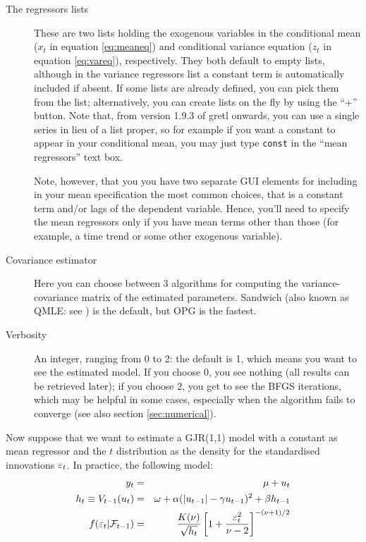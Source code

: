 \documentclass[a4paper,11pt]{article}
\newcommand{\app}[1]{\textsf{#1}}
\newcounter{script}[section]
\newcommand{\stdu}{\ensuremath \varepsilon}
\newcommand{\uhat}{\ensuremath u}
\newcommand{\InfSet}[1]{\ensuremath \mathcal{F}_{#1}}
\begin{document}
\begin{description}
\item[The regressors lists] These are two lists holding the exogenous
  variables in the conditional mean ($x_t$ in equation
  \ref{eq:meaneq}) and conditional variance equation ($z_t$ in
  equation \ref{eq:vareq}), respectively. They both default to empty
  lists, although in the variance regressors list a constant term is
  automatically included if absent. If some lists are already defined,
  you can pick them from the list; alternatively, you can create lists
  on the fly by using the ``+'' button.  Note that, from version 1.9.3
  of \app{gretl} onwards, you can use a single series in lieu of a
  list proper, so for example if you want a constant to appear in your
  conditional mean, you may just type \texttt{const} in the ``mean
  regressors'' text box.

  Note, however, that you you have two separate GUI elements for
  including in your mean specification the most common choices, that
  is a constant term and/or lags of the dependent variable. Hence,
  you'll need to specify the mean regressors only if you have mean
  terms other than those (for example, a time trend or some other
  exogenous variable).

\item[Covariance estimator] Here you can choose between 3 algorithms
  for computing the variance-covariance matrix of the estimated
  parameters. Sandwich (also known as QMLE: see \cite{bolwoo92}) is
  the default, but OPG is the fastest.
\item[Verbosity] An integer, ranging from 0 to 2: the default is 1,
  which means you want to see the estimated model. If you choose 0,
  you see nothing (all results can be retrieved later); if you choose
  2, you get to see the BFGS iterations, which may be helpful in some
  cases, especially when the algorithm fails to converge (see also
  section \ref{sec:numerical}).
\end{description}

Now suppose that we want to estimate a GJR(1,1) model with a constant
as mean regressor and the $t$ distribution as the density for the
standardised innovations $\stdu_t$. In practice, the following model:
\begin{eqnarray*}
  y_t & = & \mu + \uhat_{t} \\
  h_t \equiv V_{t-1}(\uhat_{t}) & = & \omega +
  \alpha(|\uhat_{t-1}| - \gamma \uhat_{t-1})^2 + \beta h_{t-1} \\
  f(\stdu_t | \InfSet{t-1}) & = & \frac{K(\nu)}{\sqrt{h_t}}
    \left[1+\frac{\stdu_t^2}{\nu-2}\right]^{-(\nu + 1)/2}
\end{eqnarray*}
\end{document}
